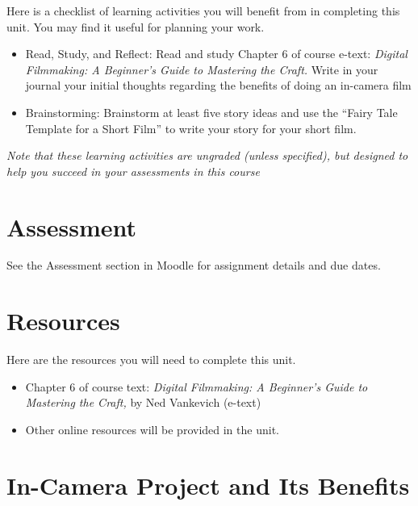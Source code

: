 \documentclass[
]{book}
\providecommand{\tightlist}{%
  \setlength{\itemsep}{0pt}\setlength{\parskip}{0pt}}
\begin{document}
\begin{reflect}
Here is a checklist of learning activities you will benefit from in completing this unit. You may find it useful for planning your work.

\begin{itemize}
\tightlist
\item
  Read, Study, and Reflect: Read and study Chapter 6 of course e-text: \emph{Digital Filmmaking: A Beginner's Guide to Mastering the Craft.} Write in your journal your initial thoughts regarding the benefits of doing an in-camera film
\item
  Brainstorming: Brainstorm at least five story ideas and use the ``Fairy Tale Template for a Short Film'' to write your story for your short film.
\end{itemize}

\emph{Note that these learning activities are ungraded (unless specified), but designed to help you succeed in your assessments in this course}
\end{reflect}

\hypertarget{assessment-8}{%
\section*{Assessment}\label{assessment-8}}

See the Assessment section in Moodle for assignment details and due dates.

\hypertarget{resources-5}{%
\section*{Resources}\label{resources-5}}

Here are the resources you will need to complete this unit.

\begin{itemize}
\tightlist
\item
  Chapter 6 of course text: \emph{Digital Filmmaking: A Beginner's Guide to Mastering the Craft,} by Ned Vankevich (e-text)
\item
  Other online resources will be provided in the unit.
\end{itemize}

\hypertarget{in-camera-project-and-its-benefits}{%
\section{In-Camera Project and Its Benefits}\label{in-camera-project-and-its-benefits}}
\end{document}
